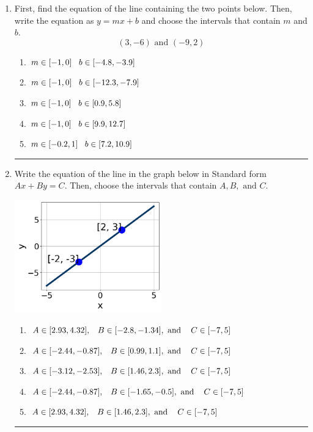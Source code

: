 \documentclass[14pt]{extbook}
\newcommand{\litem}[1]{\item#1\hspace*{-1cm}\rule{\textwidth}{0.4pt}}
\begin{document}
\begin{enumerate}
{\begin{enumerate}[label=\Alph*.]
\end{enumerate} }
\litem{
First, find the equation of the line containing the two points below. Then, write the equation as $ y=mx+b $ and choose the intervals that contain $m$ and $b$.\[ (3, -6) \text{ and } (-9, 2) \]\begin{enumerate}[label=\Alph*.]
\item \( m \in [-1, 0] \hspace*{3mm} b \in [-4.8, -3.9] \)
\item \( m \in [-1, 0] \hspace*{3mm} b \in [-12.3, -7.9] \)
\item \( m \in [-1, 0] \hspace*{3mm} b \in [0.9, 5.8] \)
\item \( m \in [-1, 0] \hspace*{3mm} b \in [9.9, 12.7] \)
\item \( m \in [-0.2, 1] \hspace*{3mm} b \in [7.2, 10.9] \)

\end{enumerate} }
\litem{
Write the equation of the line in the graph below in Standard form $Ax+By=C$. Then, choose the intervals that contain $A, B, \text{ and } C$.
\begin{center}
    \includegraphics[width=0.5\textwidth]{../Figures/linearGraphToStandardCopyB.png}
\end{center}
\begin{enumerate}[label=\Alph*.]
\item \( A \in [2.93, 4.32], \hspace{3mm} B \in [-2.8, -1.34], \text{ and } \hspace{3mm} C \in [-7, 5] \)
\item \( A \in [-2.44, -0.87], \hspace{3mm} B \in [0.99, 1.1], \text{ and } \hspace{3mm} C \in [-7, 5] \)
\item \( A \in [-3.12, -2.53], \hspace{3mm} B \in [1.46, 2.3], \text{ and } \hspace{3mm} C \in [-7, 5] \)
\item \( A \in [-2.44, -0.87], \hspace{3mm} B \in [-1.65, -0.5], \text{ and } \hspace{3mm} C \in [-7, 5] \)
\item \( A \in [2.93, 4.32], \hspace{3mm} B \in [1.46, 2.3], \text{ and } \hspace{3mm} C \in [-7, 5] \)


\end{enumerate}}
\end{enumerate}
\end{document}
